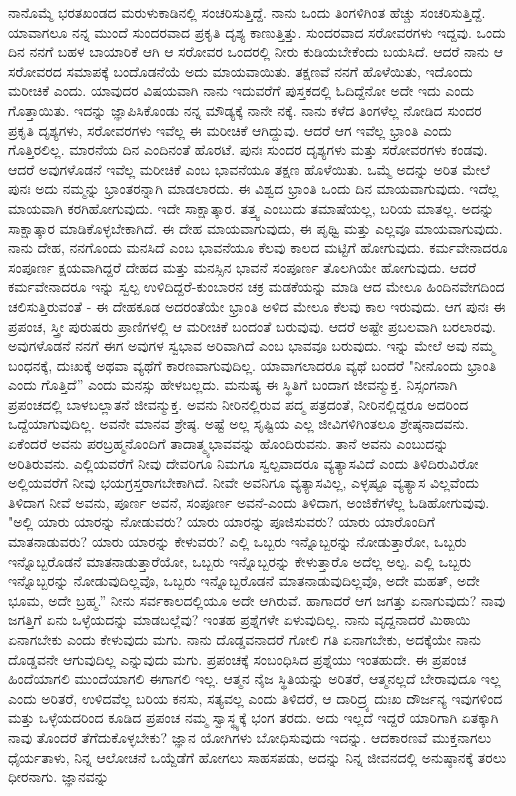 ನಾನೊಮ್ಮೆ ಭರತಖಂಡದ ಮರುಳುಕಾಡಿನಲ್ಲಿ ಸಂಚರಿಸುತ್ತಿದ್ದೆ. ನಾನು ಒಂದು ತಿಂಗಳಿಗಿಂತ ಹೆಚ್ಚು ಸಂಚರಿಸುತ್ತಿದ್ದೆ. ಯಾವಾಗಲೂ ನನ್ನ ಮುಂದೆ ಸುಂದರವಾದ ಪ್ರಕೃತಿ ದೃಶ್ಯ ಕಾಣುತ್ತಿತ್ತು. ಸುಂದರವಾದ ಸರೋವರಗಳು ಇದ್ದವು. ಒಂದು ದಿನ ನನಗೆ ಬಹಳ ಬಾಯಾರಿಕೆ ಆಗಿ ಆ ಸರೋವರ ಒಂದರಲ್ಲಿ ನೀರು ಕುಡಿಯಬೇಕೆಂದು ಬಯಸಿದೆ. ಆದರೆ ನಾನು ಆ ಸರೋವರದ ಸಮಾಪಕ್ಕೆ ಬಂದೊಡನೆಯೆ ಅದು ಮಾಯವಾಯಿತು. ತಕ್ಷಣವೆ ನನಗೆ ಹೊಳೆಯಿತು, ಇದೊಂದು ಮರೀಚಿಕೆ ಎಂದು. ಯಾವುದರ ವಿಷಯವಾಗಿ ನಾನು ಇದುವರೆಗೆ ಪುಸ್ತಕದಲ್ಲಿ ಓದಿದ್ದೆನೋ ಅದೇ ಇದು ಎಂದು ಗೊತ್ತಾಯಿತು. ಇದನ್ನು ಜ್ಞಾಪಿಸಿಕೊಂಡು ನನ್ನ ಮೌಡ್ಯಕ್ಕೆ ನಾನೇ ನಕ್ಕೆ. ನಾನು ಕಳೆದ ತಿಂಗಳೆಲ್ಲ ನೋಡಿದ ಸುಂದರ ಪ್ರಕೃತಿ ದೃಶ್ಯಗಳು, ಸರೋವರಗಳು ಇವೆಲ್ಲ ಈ ಮರೀಚಿಕೆ ಆಗಿದ್ದುವು. ಆದರೆ ಆಗ ಇವೆಲ್ಲ ಭ್ರಾಂತಿ ಎಂದು ಗೊತ್ತಿರಲಿಲ್ಲ. ಮಾರನೆಯ ದಿನ ಎಂದಿನಂತೆ ಹೊರಟೆ. ಪುನಃ ಸುಂದರ ದೃಶ್ಯಗಳು ಮತ್ತು ಸರೋವರಗಳು ಕಂಡವು. ಆದರೆ ಅವುಗಳೊಡನೆ ಇವೆಲ್ಲ ಮರೀಚಿಕೆ ಎಂಬ ಭಾವನೆಯೂ ತಕ್ಷಣ ಹೊಳೆಯಿತು. ಒಮ್ಮೆ ಅದನ್ನು ಅರಿತ ಮೇಲೆ ಪುನಃ ಅದು ನಮ್ಮನ್ನು ಭ್ರಾಂತರನ್ನಾಗಿ ಮಾಡಲಾರದು. ಈ ವಿಶ್ವದ ಭ್ರಾಂತಿ ಒಂದು ದಿನ ಮಾಯವಾಗುವುದು. ಇದೆಲ್ಲ ಮಾಯವಾಗಿ ಕರಗಿಹೋಗುವುದು. ಇದೇ ಸಾಕ್ಷಾತ್ಕಾರ. ತತ್ತ್ವ ಎಂಬುದು ತಮಾಷೆಯಲ್ಲ, ಬರಿಯ ಮಾತಲ್ಲ. ಅದನ್ನು ಸಾಕ್ಷಾತ್ಕಾರ ಮಾಡಿಕೊಳ್ಳಬೇಕಾಗಿದೆ. ಈ ದೇಹ ಮಾಯವಾಗುವುದು, ಈ ಪೃಥ್ವಿ ಮತ್ತು ಎಲ್ಲವೂ ಮಾಯವಾಗುವುದು. ನಾನು ದೇಹ, ನನಗೊಂದು ಮನಸಿದೆ ಎಂಬ ಭಾವನೆಯೂ ಕೆಲವು ಕಾಲದ ಮಟ್ಟಿಗೆ ಹೋಗುವುದು. ಕರ್ಮವೇನಾದರೂ ಸಂಪೂರ್ಣ ಕ್ಷಯವಾಗಿದ್ದರೆ ದೇಹದ ಮತ್ತು ಮನಸ್ಸಿನ ಭಾವನೆ ಸಂಪೂರ್ಣ ತೊಲಗಿಯೇ ಹೋಗುವುದು. ಆದರೆ ಕರ್ಮವೇನಾದರೂ ಇನ್ನು ಸ್ವಲ್ಪ ಉಳಿದಿದ್ದರೆ-ಕುಂಬಾರನ ಚಕ್ರ ಮಡಕೆಯನ್ನು ಮಾಡಿ ಆದ ಮೇಲೂ ಹಿಂದಿನವೇಗದಿಂದ ಚಲಿಸುತ್ತಿರುವಂತೆ - ಈ ದೇಹಕೂಡ ಅದರಂತೆಯೇ ಭ್ರಾಂತಿ ಅಳಿದ ಮೇಲೂ ಕೆಲವು ಕಾಲ ಇರುವುದು. ಆಗ ಪುನಃ ಈ ಪ್ರಪಂಚ, ಸ್ತ್ರೀ ಪುರುಷರು ಪ್ರಾಣಿಗಳಲ್ಲಿ ಆ ಮರೀಚಿಕೆ ಬಂದಂತೆ ಬರುವುವು. ಆದರೆ ಅಷ್ಟೇ ಪ್ರಬಲವಾಗಿ ಬರಲಾರವು. ಅವುಗಳೊಡನೆ ನನಗೆ ಈಗ ಅವುಗಳ ಸ್ವಭಾವ ಅರಿವಾಗಿದೆ ಎಂಬ ಭಾವವೂ ಬರುವುದು. ಇನ್ನು ಮೇಲೆ ಅವು ನಮ್ಮ ಬಂಧನಕ್ಕೆ, ದುಃಖಕ್ಕೆ ಅಥವಾ ವ್ಯಥೆಗೆ ಕಾರಣವಾಗುವುದಿಲ್ಲ. ಯಾವಾಗಲಾದರೂ ವ್ಯಥೆ ಬಂದರೆ "ನೀನೊಂದು ಭ್ರಾಂತಿ ಎಂದು ಗೊತ್ತಿದೆ'' ಎಂದು ಮನಸ್ಸು ಹೇಳಬಲ್ಲದು. ಮನುಷ್ಯ ಈ ಸ್ಥಿತಿಗೆ ಬಂದಾಗ ಜೀವನ್ಮುಕ್ತ. ನಿಸ್ಸಂಗನಾಗಿ ಪ್ರಪಂಚದಲ್ಲಿ ಬಾಳಬಲ್ಲಾತನೆ ಜೀವನ್ಮುಕ್ತ. ಅವನು ನೀರಿನಲ್ಲಿರುವ ಪದ್ಮ ಪತ್ರದಂತೆ, ನೀರಿನಲ್ಲಿದ್ದರೂ ಅದರಿಂದ ಒದ್ದೆಯಾಗುವುದಿಲ್ಲ. ಅವನೇ ಮಾನವ ಶ್ರೇಷ್ಠ. ಅಷ್ಟೆ ಅಲ್ಲ ಸೃಷ್ಟಿಯ ಎಲ್ಲ ಜೀವಿಗಳಿಗಿಂತಲೂ ಶ್ರೇಷ್ಠನಾದವನು. ಏಕೆಂದರೆ ಅವನು ಪರಬ್ರಹ್ಮನೊಂದಿಗೆ ತಾದಾತ್ಮ್ಯಭಾವವನ್ನು ಹೊಂದಿರುವನು. ತಾನೆ ಅವನು ಎಂಬುದನ್ನು ಅರಿತಿರುವನು. ಎಲ್ಲಿಯವರೆಗೆ ನೀವು ದೇವರಿಗೂ ನಿಮಗೂ ಸ್ವಲ್ಪವಾದರೂ ವ್ಯತ್ಯಾಸವಿದೆ ಎಂದು ತಿಳಿದಿರುವಿರೋ ಅಲ್ಲಿಯವರೆಗೆ ನೀವು ಭಯಗ್ರಸ್ತರಾಗಬೇಕಾಗಿದೆ. ನೀವೇ ಅವನಿಗೂ ವ್ಯತ್ಯಾಸವಿಲ್ಲ, ಎಳ್ಳಷ್ಟೂ ವ್ಯತ್ಯಾಸ ವಿಲ್ಲವೆಂದು ತಿಳಿದಾಗ ನೀವೆ ಅವನು, ಪೂರ್ಣ ಅವನೆ, ಸಂಪೂರ್ಣ ಅವನೆ-ಎಂದು ತಿಳಿದಾಗ, ಅಂಜಿಕೆಗಳೆಲ್ಲ ಓಡಿಹೋಗುವುವು. "ಅಲ್ಲಿ ಯಾರು ಯಾರನ್ನು ನೋಡುವರು? ಯಾರು ಯಾರನ್ನು ಪೂಜಿಸುವರು? ಯಾರು ಯಾರೊಂದಿಗೆ ಮಾತನಾಡುವರು? ಯಾರು ಯಾರನ್ನು ಕೇಳುವರು? ಎಲ್ಲಿ ಒಬ್ಬರು ಇನ್ನೊಬ್ಬರನ್ನು ನೋಡುತ್ತಾರೋ, ಒಬ್ಬರು ಇನ್ನೊಬ್ಬರೊಡನೆ ಮಾತನಾಡುತ್ತಾರೆಯೋ, ಒಬ್ಬರು ಇನ್ನೊಬ್ಬರನ್ನು ಕೇಳುತ್ತಾರೊ ಅದೆಲ್ಲ ಅಲ್ಪ. ಎಲ್ಲಿ ಒಬ್ಬರು ಇನ್ನೊಬ್ಬರನ್ನು ನೋಡುವುದಿಲ್ಲವೊ, ಒಬ್ಬರು ಇನ್ನೊಬ್ಬರೊಡನೆ ಮಾತನಾಡುವುದಿಲ್ಲವೊ, ಅದೇ ಮಹತ್, ಅದೇ ಭೂಮ, ಅದೇ ಬ್ರಹ್ಮ.” ನೀನು ಸರ್ವಕಾಲದಲ್ಲಿಯೂ ಅದೇ ಆಗಿರುವೆ. ಹಾಗಾದರೆ ಆಗ ಜಗತ್ತು ಏನಾಗುವುದು? ನಾವು ಜಗತ್ತಿಗೆ ಏನು ಒಳ್ಳೆಯದನ್ನು ಮಾಡಬಲ್ಲೆವು? ಇಂತಹ ಪ್ರಶ್ನೆಗಳೇ ಏಳುವುದಿಲ್ಲ. ನಾನು ವೃದ್ದನಾದರೆ ಮಿಠಾಯಿ ಏನಾಗಬೇಕು ಎಂದು ಕೇಳುವುದು ಮಗು. ನಾನು ದೊಡ್ಡವನಾದರೆ ಗೋಲಿ ಗತಿ ಏನಾಗಬೇಕು, ಅದಕ್ಕೆಯೇ ನಾನು ದೊಡ್ಡವನೇ ಆಗುವುದಿಲ್ಲ ಎನ್ನುವುದು ಮಗು. ಪ್ರಪಂಚಕ್ಕೆ ಸಂಬಂಧಿಸಿದ ಪ್ರಶ್ನೆಯು ಇಂತಹುದೇ. ಈ ಪ್ರಪಂಚ ಹಿಂದೆಯಾಗಲಿ ಮುಂದೆಯಾಗಲಿ ಈಗಾಗಲಿ ಇಲ್ಲ. ಆತ್ಮನ ನೈಜ ಸ್ಥಿತಿಯನ್ನು ಅರಿತರೆ, ಆತ್ಮನಲ್ಲದೆ ಬೇರಾವುದೂ ಇಲ್ಲ ಎಂದು ಅರಿತರೆ, ಉಳಿದವೆಲ್ಲ ಬರಿಯ ಕನಸು, ಸತ್ಯವಲ್ಲ ಎಂದು ತಿಳಿದರೆ, ಆ ದಾರಿದ್ರ್ಯ ದುಃಖ ದೌರ್ಜನ್ಯ ಇವುಗಳಿಂದ ಮತ್ತು ಒಳ್ಳೆಯದರಿಂದ ಕೂಡಿದ ಪ್ರಪಂಚ ನಮ್ಮ ಸ್ವಾಸ್ಥ್ಯಕ್ಕೆ ಭಂಗ ತರದು. ಅದು ಇಲ್ಲದೆ ಇದ್ದರೆ ಯಾರಿಗಾಗಿ ಏತಕ್ಕಾಗಿ ನಾವು ತೊಂದರೆ ತೆಗೆದುಕೊಳ್ಳಬೇಕು? ಜ್ಞಾನ ಯೋಗಿಗಳು ಬೋಧಿಸುವುದು ಇದನ್ನು. ಆದಕಾರಣವೆ ಮುಕ್ತನಾಗಲು ಧೈರ್ಯತಾಳು, ನಿನ್ನ ಆಲೋಚನೆ ಒಯ್ದೆಡೆಗೆ ಹೋಗಲು ಸಾಹಸಪಡು, ಅದನ್ನು ನಿನ್ನ ಜೀವನದಲ್ಲಿ ಅನುಷ್ಠಾನಕ್ಕೆ ತರಲು ಧೀರನಾಗು. ಜ್ಞಾನವನ್ನು 